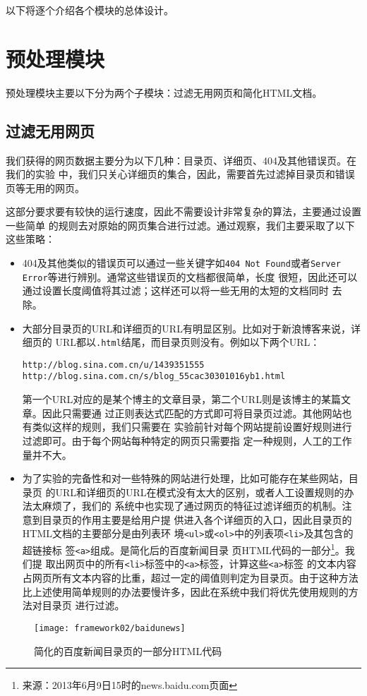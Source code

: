 以下将逐个介绍各个模块的总体设计。
\section{预处理模块}
\label{sec:filterintro}
预处理模块主要以下分为两个子模块：过滤无用网页和简化HTML文档。
\subsection{过滤无用网页}
\label{sec:filterintro-useless}
我们获得的网页数据主要分为以下几种：目录页、详细页、404及其他错误页。在我们的实验
中，我们只关心详细页的集合，因此，需要首先过滤掉目录页和错误页等无用的网页。

这部分要求要有较快的运行速度，因此不需要设计非常复杂的算法，主要通过设置一些简单
的规则去对原始的网页集合进行过滤。通过观察，我们主要采取了以下这些策略：
\begin{itemize}
\item 404及其他类似的错误页可以通过一些关键字如\texttt{404 Not
    Found}或者\texttt{Server Error}等进行辨别。通常这些错误页的文档都很简单，长度
  很短，因此还可以通过设置长度阈值将其过滤；这样还可以将一些无用的太短的文档同时
  去除。
\item 大部分目录页的URL和详细页的URL有明显区别。比如对于新浪博客来说，详细页的
  URL都以\texttt{.html}结尾，而目录页则没有。例如以下两个URL：
\begin{verbatim}
http://blog.sina.com.cn/u/1439351555
http://blog.sina.com.cn/s/blog_55cac30301016yb1.html
\end{verbatim}
第一个URL对应的是某个博主的文章目录，第二个URL则是该博主的某篇文章。因此只需要通
过正则表达式匹配的方式即可将目录页过滤。其他网站也有类似这样的规则，我们只需要在
实验前针对每个网站提前设置好规则进行过滤即可。由于每个网站每种特定的网页只需要指
定一种规则，人工的工作量并不大。
\item 为了实验的完备性和对一些特殊的网站进行处理，比如可能存在某些网站，目录页
  的URL和详细页的URL在模式没有太大的区别，或者人工设置规则的办法太麻烦了，我们的
  系统中也实现了通过网页的特征过滤详细页的机制。注意到目录页的作用主要是给用户提
  供进入各个详细页的入口，因此目录页的HTML文档的主要部分是由列表环
  境\texttt{<ul>}或\texttt{<ol>}中的列表项\texttt{<li>}及其包含的超链接标
  签\texttt{<a>}组成。是简化后的百度新闻目录
  页HTML代码的一部分\footnote{来源：2013年6月9日15时的news.baidu.com页面}。我们提
  取出网页中的所有\texttt{<li>}标签中的\texttt{<a>}标签，计算这些\texttt{<a>}标签
  的文本内容占网页所有文本内容的比重，超过一定的阈值则判定为目录页。由于这种方法
  比上述使用简单规则的办法要慢许多，因此在系统中我们将优先使用规则的方法对目录页
  进行过滤。
\end{itemize}
\begin{figure}
  \centering
  \texttt{[image: framework02/baidunews]}
  \caption{简化的百度新闻目录页的一部分HTML代码}
  \label{framework:fig:baidunews}
\end{figure}

